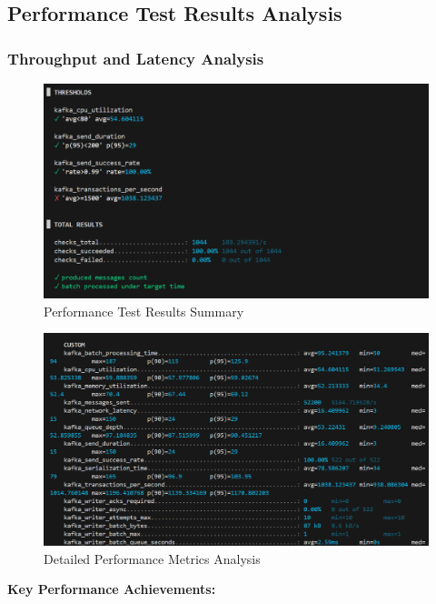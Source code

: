 \subsection{Performance Test Results Analysis}

\subsubsection{Throughput and Latency Analysis}

\begin{figure}[h]
    \centering
    \includegraphics[width=1\textwidth]{metrics/k6-bilan.png}
    \caption{Performance Test Results Summary}
    \label{fig:load-test-results}
\end{figure}

\begin{figure}[h]
    \centering
    \includegraphics[width=1\textwidth]{metrics/kafka-metrics.png}
    \caption{Detailed Performance Metrics Analysis}
    \label{fig:load-test-detailed}
\end{figure}

\textbf{Key Performance Achievements:}

